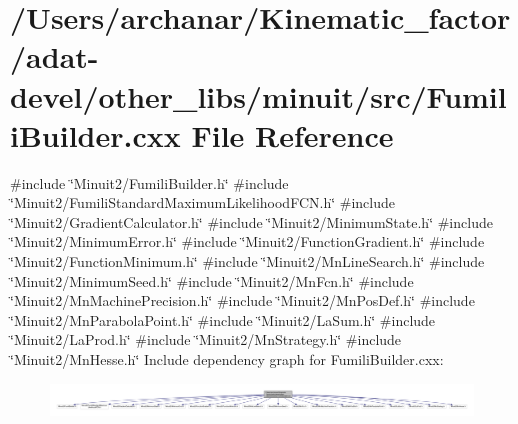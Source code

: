 \hypertarget{adat-devel_2other__libs_2minuit_2src_2FumiliBuilder_8cxx}{}\section{/\+Users/archanar/\+Kinematic\+\_\+factor/adat-\/devel/other\+\_\+libs/minuit/src/\+Fumili\+Builder.cxx File Reference}
\label{adat-devel_2other__libs_2minuit_2src_2FumiliBuilder_8cxx}
{\ttfamily \#include \char`\"{}Minuit2/\+Fumili\+Builder.\+h\char`\"{}}\newline
{\ttfamily \#include \char`\"{}Minuit2/\+Fumili\+Standard\+Maximum\+Likelihood\+F\+C\+N.\+h\char`\"{}}\newline
{\ttfamily \#include \char`\"{}Minuit2/\+Gradient\+Calculator.\+h\char`\"{}}\newline
{\ttfamily \#include \char`\"{}Minuit2/\+Minimum\+State.\+h\char`\"{}}\newline
{\ttfamily \#include \char`\"{}Minuit2/\+Minimum\+Error.\+h\char`\"{}}\newline
{\ttfamily \#include \char`\"{}Minuit2/\+Function\+Gradient.\+h\char`\"{}}\newline
{\ttfamily \#include \char`\"{}Minuit2/\+Function\+Minimum.\+h\char`\"{}}\newline
{\ttfamily \#include \char`\"{}Minuit2/\+Mn\+Line\+Search.\+h\char`\"{}}\newline
{\ttfamily \#include \char`\"{}Minuit2/\+Minimum\+Seed.\+h\char`\"{}}\newline
{\ttfamily \#include \char`\"{}Minuit2/\+Mn\+Fcn.\+h\char`\"{}}\newline
{\ttfamily \#include \char`\"{}Minuit2/\+Mn\+Machine\+Precision.\+h\char`\"{}}\newline
{\ttfamily \#include \char`\"{}Minuit2/\+Mn\+Pos\+Def.\+h\char`\"{}}\newline
{\ttfamily \#include \char`\"{}Minuit2/\+Mn\+Parabola\+Point.\+h\char`\"{}}\newline
{\ttfamily \#include \char`\"{}Minuit2/\+La\+Sum.\+h\char`\"{}}\newline
{\ttfamily \#include \char`\"{}Minuit2/\+La\+Prod.\+h\char`\"{}}\newline
{\ttfamily \#include \char`\"{}Minuit2/\+Mn\+Strategy.\+h\char`\"{}}\newline
{\ttfamily \#include \char`\"{}Minuit2/\+Mn\+Hesse.\+h\char`\"{}}\newline
Include dependency graph for Fumili\+Builder.\+cxx\+:
\nopagebreak
\begin{figure}[H]
\begin{center}
\leavevmode
\includegraphics[width=350pt]{d0/d5e/adat-devel_2other__libs_2minuit_2src_2FumiliBuilder_8cxx__incl}
\end{center}
\end{figure}
